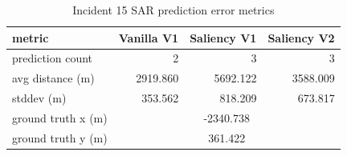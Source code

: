 \begin{table}[ht]
\centering
\caption{Incident 15 SAR prediction error metrics}
\label{tab:sar-incident-15}
\begin{tabular}{lrrr}
\hline
metric & Vanilla V1 & Saliency V1 & Saliency V2 \\
\hline
prediction count & 2 & 3 & 3 \\
avg distance (m) & 2919.860 & 5692.122 & 3588.009 \\
stddev (m) & 353.562 & 818.209 & 673.817 \\
ground truth x (m) & \multicolumn{3}{c}{-2340.738} \\
ground truth y (m) & \multicolumn{3}{c}{361.422} \\
\hline
\end{tabular}
\end{table}
